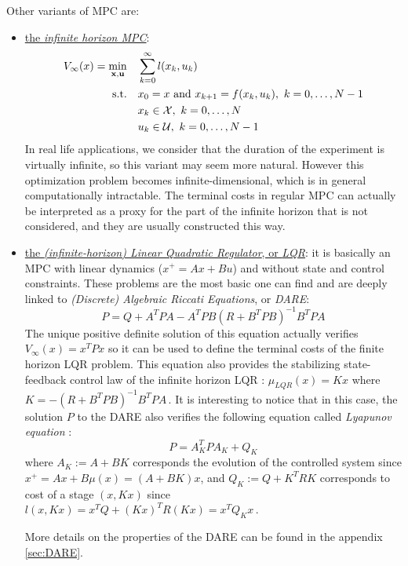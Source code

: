 \documentclass[12pt]{article}
\begin{document}
\vspace{12pt}

\noindent Other variants of MPC are:
\begin{itemize}[label=\textbullet]
	\item \underline{the \textit{infinite horizon MPC}}:
	\begin{align*}
		V_\infty(x)=\underset{\bf{x},\bf{u}}{\min} &\quad \sum_{k=0}^{\infty}l(x_k,u_k)\\
		\text{s.t.} &\quad x_0=x\text{ and }x_{k+1}=f(x_k,u_k),~k=0,\dots,N-1\\
		&\quad x_k\in\cal{X},~k=0,\dots,N\\
		&\quad u_k\in\cal{U},~k=0,\dots,N-1
	\end{align*}
	In real life applications, we consider that the duration of the experiment is virtually infinite, so this variant may seem more natural.
	However this optimization problem becomes infinite-dimensional, which is in general computationally intractable.
	The terminal costs in regular MPC can actually be interpreted as a proxy for the part of the infinite horizon that is not considered, and they are usually constructed this way.

	\item\underline{the \textit{(infinite-horizon) Linear Quadratic Regulator}, or \textit{LQR}}:\newline
	it is basically an MPC with linear dynamics ($x^+=Ax+Bu$) and without state and control constraints.
	These problems are the most basic one can find and are deeply linked to \textit{(Discrete) Algebraic Riccati Equations}, or \textit{DARE}:
	\begin{equation}
		\label{eq:DARE-LQR}
		P=Q+A^TPA-A^TPB(R+B^TPB)^{-1}B^TPA
	\end{equation}
	The unique positive definite solution of this equation actually verifies $V_\infty(x)=x^TPx$ so it can be used to define the terminal costs of the finite horizon LQR problem.
	This equation also provides the stabilizing state-feedback control law of the infinite horizon LQR : $\mu_{LQR}(x)=Kx$ where $K=-(R+B^TPB)^{-1}B^TPA$\,.
	It is interesting to notice that in this case, the solution $P$ to the DARE also verifies the following equation called \textit{Lyapunov equation} :
	$$P=A_K^TPA_K+Q_K$$
	where $A_K:=A+BK$ corresponds the evolution of the controlled system since $x^+=Ax+B\mu(x)=(A+BK)x$, and $Q_K:=Q+K^TRK$ corresponds to cost of a stage $(x,Kx)$ since $l(x,Kx)=x^TQ+(Kx)^TR(Kx)=x^TQ_Kx$\,.

	More details on the properties of the DARE can be found in the appendix \ref{sec:DARE}.
\end{itemize}
\end{document}
